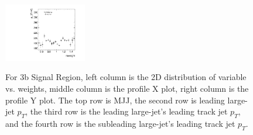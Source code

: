\begin{figure}[htbp!]
\begin{center}
\includegraphics[width=0.32\textwidth,angle=-90]{figures/boosted/AppendixReweight/Weights/3Trk_Signal_sublHCand_trk0_Pt_weight_profy.pdf}\\
\caption{For 3b Signal Region, left column is the 2D distribution of variable vs. weights, middle column is the profile X plot, right column is the profile Y plot. The top row is MJJ, the second row is leading large-\R jet $p_{T}$, the third row is the leading large-\R jet's leading track jet $p_{T}$, and the fourth row is the subleading large-\R jet's leading track jet $p_{T}$.}
\label{fig:app-reweight-dist-3b-SR}
\end{center}
\end{figure}


